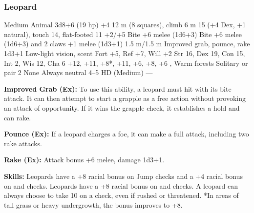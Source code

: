 \subsubsection{Leopard}
\begin{MonsterStats}
{Medium Animal}
{3d8+6 (19 hp)}
{+4}
{12 m (8 squares), climb 6 m}
{15 (+4 Dex, +1 natural), touch 14, flat-footed 11}
{+2/+5}
{Bite +6 melee (1d6+3)}
{Bite +6 melee (1d6+3) and 2 claws +1 melee (1d3+1)}
{1.5 m/1.5 m}
{Improved grab, pounce, rake 1d3+1}
{Low-light vision, scent}
{Fort +5, Ref +7, Will +2}
{Str 16, Dex 19, Con 15, Int 2, Wis 12, Cha 6}
{ +12,  +11,  +8*,  +11,  +6,  +8,  +6}
{, }
{Warm forests}
{Solitary or pair}
{2}
{None}
{Always neutral}
{4--5 HD (Medium)}
{---}
\end{MonsterStats}

\textbf{Improved Grab (Ex):} To use this ability, a leopard must hit with its bite attack. It can then attempt to start a grapple as a free action without provoking an attack of opportunity. If it wins the grapple check, it establishes a hold and can rake.

\textbf{Pounce (Ex):} If a leopard charges a foe, it can make a full attack, including two rake attacks.

\textbf{Rake (Ex):} Attack bonus +6 melee, damage 1d3+1.

\textbf{Skills:} Leopards have a +8 racial bonus on Jump checks and a +4 racial bonus on  and  checks. Leopards have a +8 racial bonus on  and  checks. A leopard can always choose to take 10 on a  check, even if rushed or threatened. *In areas of tall grass or heavy undergrowth, the  bonus improves to +8.

